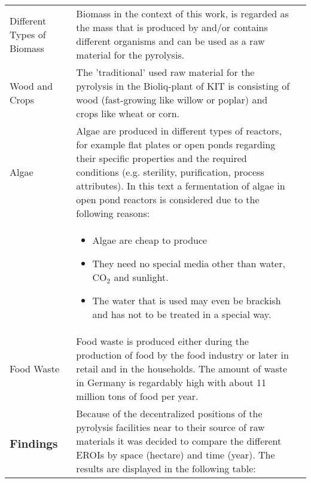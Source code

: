 \begin{xtabular}{|p{3.8cm}|p{8.3cm}|p{4.2cm}|}
 	\\
 	Different Types of Biomass
 	&
 	Biomass in the context of this work, is regarded as the mass that is produced by and/or contains different organisms and can be used as a raw material for the pyrolysis.
 	&
 	
 	\\
	Wood and Crops
 	&
 	The 'traditional' used raw material for the pyrolysis in the Bioliq-plant of KIT is consisting of wood (fast-growing like willow or poplar) and crops like wheat or corn. 
 	&
 	\\
 	Algae
 	&
 	Algae are produced in different types of reactors, for example flat plates or open ponds regarding their specific properties and the required conditions (e.g. sterility, purification, process attributes). In this text a fermentation of algae in open pond reactors is considered due to the following reasons:
 	&
 	\\

 	&
 	\begin{itemize}
 		\item Algae are cheap to produce
 		\item They need no special media other than water, $\text{CO}_2$ and sunlight.
 		\item The water that is used may even be brackish and has not to be treated in a special way.
 	\end{itemize}
 	&
 	
 	\\
 	Food Waste
 	&
 	Food waste is produced either during the production of food by the food industry or later in retail and in the households. The amount of waste in Germany is regardably high with about 11 million tons of food per year.
 	&
 	
 	\\
 	\vspace*{-1.25\baselineskip}\subsubsection{Findings}
 	& 
 	Because of the decentralized positions of the pyrolysis facilities near to their source of raw materials it was decided to compare the different EROIs by space (hectare) and time (year). The results are displayed in the following table:
 	&
 	\\
 	

\end{xtabular}
